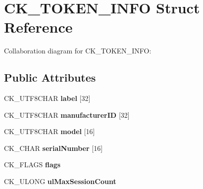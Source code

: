 \hypertarget{struct_c_k___t_o_k_e_n___i_n_f_o}{}\section{C\+K\+\_\+\+T\+O\+K\+E\+N\+\_\+\+I\+N\+FO Struct Reference}
\label{struct_c_k___t_o_k_e_n___i_n_f_o}


Collaboration diagram for C\+K\+\_\+\+T\+O\+K\+E\+N\+\_\+\+I\+N\+FO\+:
\subsection*{Public Attributes}
\begin{DoxyCompactItemize}
\item 
\mbox{\label{struct_c_k___t_o_k_e_n___i_n_f_o_a2d141d73cfecdc4b5012e239b465f37f}} 
C\+K\+\_\+\+U\+T\+F8\+C\+H\+AR {\bfseries label} \mbox{[}32\mbox{]}
\item 
\mbox{\label{struct_c_k___t_o_k_e_n___i_n_f_o_a0646cf40221dac457ea5b049f5a0f3b5}} 
C\+K\+\_\+\+U\+T\+F8\+C\+H\+AR {\bfseries manufacturer\+ID} \mbox{[}32\mbox{]}
\item 
\mbox{\label{struct_c_k___t_o_k_e_n___i_n_f_o_a3a1af28eecdf49884252468fc2aa9005}} 
C\+K\+\_\+\+U\+T\+F8\+C\+H\+AR {\bfseries model} \mbox{[}16\mbox{]}
\item 
\mbox{\label{struct_c_k___t_o_k_e_n___i_n_f_o_a139c0665509edcb172f5dd0b7ba6933e}} 
C\+K\+\_\+\+C\+H\+AR {\bfseries serial\+Number} \mbox{[}16\mbox{]}
\item 
\mbox{\label{struct_c_k___t_o_k_e_n___i_n_f_o_a6b28ba5e0098ddc36938fcf2d6edff25}} 
C\+K\+\_\+\+F\+L\+A\+GS {\bfseries flags}
\item 
\mbox{\label{struct_c_k___t_o_k_e_n___i_n_f_o_ad7a6ec88e7857ec6eeb0d0cebb3e05d4}} 
C\+K\+\_\+\+U\+L\+O\+NG {\bfseries ul\+Max\+Session\+Count}
\item 
\mbox{\label{struct_c_k___t_o_k_e_n___i_n_f_o_a3f40583f6aa0e3aba1ac591b34b6fafd}} 

\end{DoxyCompactItemize}

